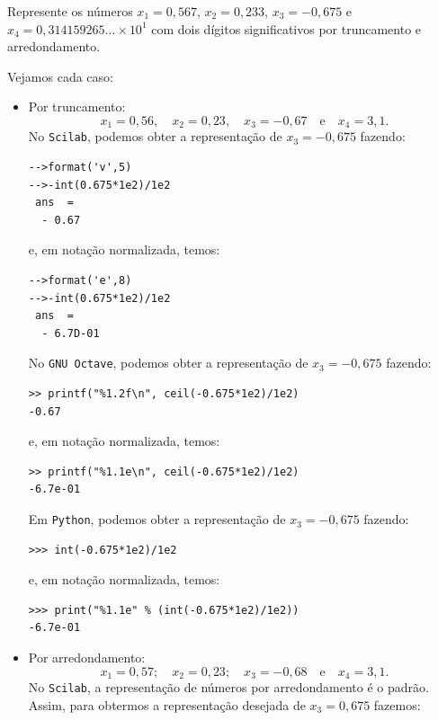 \begin{ex} Represente os números $x_1 = 0,567$, $x_2 = 0,233$, $x_3 = -0,675$ e $x_4 = 0,314159265 \ldots \times 10^1$ com dois dígitos significativos por truncamento e arredondamento.
\end{ex}
\begin{sol} Vejamos cada caso:
  \begin{itemize}
  \item Por truncamento:
    \begin{equation*}
      x_1=0,56,\quad x_2=0,23,\quad x_3=-0,67\quad\mbox{e}\quad x_4 = 3,1.
    \end{equation*}
\ifisscilab
No \verb+Scilab+, podemos obter a representação de $x_3 = -0,675$ fazendo:
\begin{verbatim}
-->format('v',5)
-->-int(0.675*1e2)/1e2
 ans  =
  - 0.67  
\end{verbatim}
e, em notação normalizada, temos:
\begin{verbatim}
-->format('e',8)
-->-int(0.675*1e2)/1e2
 ans  =
  - 6.7D-01  
\end{verbatim}
\fi
\ifisoctave
No \verb+GNU Octave+, podemos obter a representação de $x_3 = -0,675$ fazendo:
\begin{verbatim}
>> printf("%1.2f\n", ceil(-0.675*1e2)/1e2)
-0.67
\end{verbatim}
e, em notação normalizada, temos:
\begin{verbatim}
>> printf("%1.1e\n", ceil(-0.675*1e2)/1e2)
-6.7e-01
\end{verbatim}
\fi
\ifispython
Em \verb+Python+, podemos obter a representação de $x_3 = -0,675$ fazendo:
\begin{verbatim}
>>> int(-0.675*1e2)/1e2
\end{verbatim}
e, em notação normalizada, temos:
\begin{verbatim}
>>> print("%1.1e" % (int(-0.675*1e2)/1e2))
-6.7e-01
\end{verbatim}
\fi
\item Por arredondamento:
\begin{equation*}
   x_1=0,57;\quad x_2=0,23;\quad x_3=-0,68\quad\mbox{e}\quad x_4 = 3,1.  
\end{equation*}
\ifisscilab
No \verb+Scilab+, a representação de números por arredondamento é o padrão. Assim, para obtermos a representação desejada de $x_3 = 0,675$ fazemos:

\end{itemize}
\end{sol}
